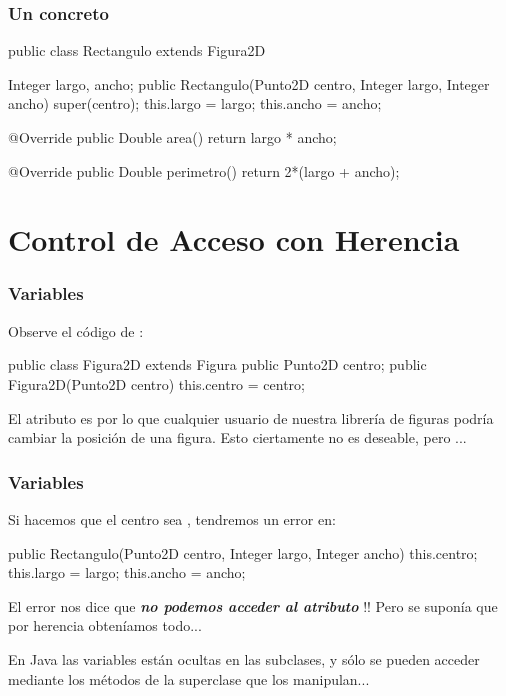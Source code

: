 \documentclass{beamer}
\begin{document}
\begin{frame}[fragile]
  \frametitle{Un  concreto}
  \begin{jsmall}
    public class Rectangulo extends Figura2D {
      Integer largo, ancho;
      public Rectangulo(Punto2D centro, Integer largo, Integer ancho) {
        super(centro);
        this.largo = largo;
        this.ancho = ancho;
      }

      @Override
      public Double area() {
        return largo * ancho;
      }

      @Override
      public Double perimetro() {
        return 2*(largo + ancho);
      }        
    }
  \end{jsmall}  
\end{frame}

\section{Control de Acceso con Herencia}

\begin{frame}[fragile]
  \frametitle{Variables }

Observe el código de :

\begin{jsmall}
public class Figura2D extends Figura {
  public Punto2D centro;
  public Figura2D(Punto2D centro) {
    this.centro = centro;
  }
}
\end{jsmall}

El atributo es  por lo que cualquier usuario de nuestra
librería de figuras podría cambiar la posición de una figura. Esto
ciertamente no es deseable, pero ...

\end{frame}

\begin{frame}[fragile]
  \frametitle{Variables }

Si hacemos que el centro sea , tendremos un error en:

\begin{jsmall}
public Rectangulo(Punto2D centro, Integer largo, Integer ancho) {
  this.centro;
  this.largo = largo;
  this.ancho = ancho;
}
\end{jsmall}

El error nos dice que \textbf{\textit{no podemos acceder al atributo
    }}!! Pero se suponía que por herencia obteníamos
todo...

En Java las variables  están ocultas en las subclases,
y sólo se pueden acceder mediante los métodos de la superclase que los
manipulan...

\end{frame}
\end{document}
